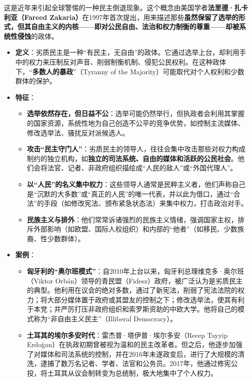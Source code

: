 这是近年来引起全球警惕的一种民主倒退现象。这个概念由美国学者\textbf{法里德·扎卡利亚（Fareed Zakaria）}在1997年首次提出，用来描述那些\textbf{虽然保留了选举的形式，但其自由主义的内核——即对公民自由、法治和权力制衡的尊重——却被系统性侵蚀}的政体。

\begin{itemize}
    \item \textbf{定义}：劣质民主是一种“有民主，无自由”的政体。它通过选举上台，却利用手中的权力来压制反对声音、削弱制衡机制、侵犯公民权利。在这种政体下，“\textbf{多数人的暴政}”（Tyranny of the Majority）可能取代对个人权利和少数群体的保护。
    \item \textbf{特征}：
    \begin{itemize}
        \item \textbf{选举依然存在，但日益不公}：选举可能仍然举行，但执政者会利用其掌握的国家资源，系统性地为自己创造不公平的竞争优势，如控制主流媒体、修改选举法、骚扰反对派候选人。
        \item \textbf{攻击“民主守门人”}：劣质民主的领导人，往往会集中攻击那些对权力构成制约的独立机构，如\textbf{独立的司法系统、自由的媒体和活跃的公民社会}。他们会将法官、记者、非政府组织描绘成“人民的敌人”或“外国代理人”。
        \item \textbf{以“人民”的名义集中权力}：这些领导人通常是民粹主义者，他们声称自己是“沉默的大多数”或“真正的人民”的唯一代表，并以此为借口，通过“合法”的手段（如修改宪法、颁布紧急状态法）来集中权力，打击政治对手。
        \item \textbf{民族主义与排外}：他们常常诉诸强烈的民族主义情绪，强调国家主权，排斥外部影响（如欧盟、国际人权组织）和内部的“他者”（如移民、少数族裔、性少数群体）。
    \end{itemize}
    \item \textbf{案例}：
    \begin{itemize}
        \item \textbf{匈牙利的“奥尔班模式”}：自2010年上台以来，匈牙利总理维克多·奥尔班（Viktor Orbán）领导的青民盟（Fidesz）政府，被广泛认为是劣质民主的典型。他利用在议会的绝对多数，通过了新宪法，削弱了宪法法院的权力；将大部分媒体置于政府或其盟友的控制之下；修改选举法，使其有利于本党；并严厉打压非政府组织和索罗斯资助的中欧大学。他将自己的模式称为“非自由主义民主”（Illiberal Democracy）。
        \item \textbf{土耳其的埃尔多安时代}：雷杰普·塔伊普·埃尔多安（Recep Tayyip Erdoğan）在执政初期曾被视为温和的民主改革者。但之后，他逐步加强了对媒体和司法系统的控制，并在2016年未遂政变后，进行了大规模的清洗，逮捕了数万名记者、学者、法官和公务员。2017年，他通过修宪公投，将土耳其从议会制转变为总统制，极大地集中了个人权力。
    \end{itemize}
\end{itemize}

